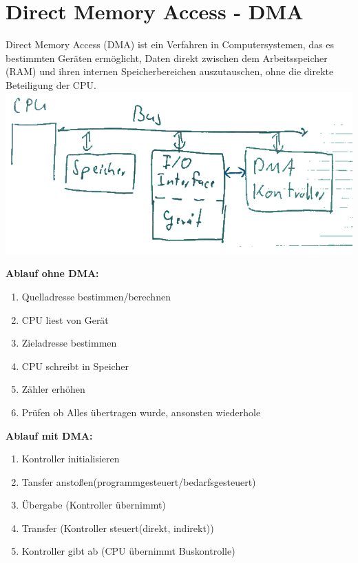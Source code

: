 \documentclass[12pt,a4paper]{article}
\begin{document}
\section{Direct Memory Access - DMA}
	Direct Memory Access (DMA) ist ein Verfahren in Computersystemen, das es bestimmten Geräten ermöglicht, Daten direkt zwischen dem Arbeitsspeicher (RAM) und ihren internen Speicherbereichen auszutauschen, ohne die direkte Beteiligung der CPU.\\
	\includegraphics[width=\textwidth]{Bilder/dma-removedBg.png}\vspace{1cm}\\
	\begin{minipage}[c]{0.5\textwidth}
		\textbf{Ablauf ohne DMA:}
		\begin{enumerate}
			\item Quelladresse bestimmen/berechnen
			\item CPU liest von Gerät
			\item Zieladresse bestimmen 
			\item CPU schreibt in Speicher
			\item Zähler erhöhen
			\item Prüfen ob Alles übertragen wurde, ansonsten wiederhole
		\end{enumerate}
	\end{minipage}
	\begin{minipage}[c]{0.5\textwidth}
		\textbf{Ablauf mit DMA:}
		\begin{enumerate}
			\item Kontroller initialisieren
			\item Tansfer anstoßen(programmgesteuert/bedarfsgesteuert)
			\item Übergabe (Kontroller übernimmt)
			\item Transfer (Kontroller steuert(direkt, indirekt))
			\item Kontroller gibt ab (CPU übernimmt Buskontrolle)
		\end{enumerate}
	\end{minipage}
\end{document}
